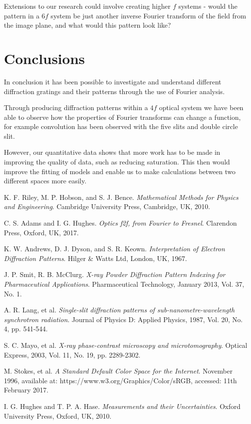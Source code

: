 \documentclass[twocolumn]{revtex4}
\begin{document}
Extensions to our research could involve creating higher $f$ systems - would the pattern in a $6f$ system be just another inverse Fourier transform of the field from the image plane, and what would this pattern look like?

\vspace{-5ex}
\section{Conclusions}
\vspace{-2ex}

In conclusion it has been possible to investigate and understand different diffraction gratings and their patterns through the use of Fourier analysis.

Through producing diffraction patterns within a $4f$ optical system we have been able to observe how the properties of Fourier transforms can change a function, for example convolution has been observed with the five slits and double circle slit.

However, our quantitative data shows that more work has to be made in improving the quality of data, such as reducing saturation. This then would improve the fitting of models and enable us to make calculations between two different spaces more easily.

\begin{thebibliography}{5}
	K. F. Riley, M. P. Hobson, and S. J. Bence.
	\textit{Mathematical Methods for Physics and Engineering}.
	Cambridge University Press, Cambridge, UK, 2010.
	
	C. S. Adams and I. G. Hughes.
	\textit{Optics f2f, from Fourier to Fresnel}.
	Clarendon Press, Oxford, UK, 2017.

	K. W. Andrews, D. J. Dyson, and S. R. Keown.
	\textit{Interpretation of Electron Diffraction Patterns}.
	Hilger \& Watts Ltd, London, UK, 1967.
	
	J. P. Smit, R. B. McClurg.	
	\textit{X-ray Powder Diffraction Pattern Indexing for Pharmaceutical Applications}.
	Pharmaceutical Technology, January 2013, Vol. 37, No. 1.
	
	A. R. Lang, et al.
	\textit{Single-slit diffraction patterns of sub-nanometre-wavelength synchrotron radiation}.
	Journal of Physics D: Applied Physics, 1987, Vol. 20, No. 4, pp. 541-544.
	
	S. C. Mayo, et al.
	\textit{X-ray phase-contrast microscopy and microtomography}.
	Optical Express, 2003, Vol. 11, No. 19, pp. 2289-2302.
	
	M. Stokes, et al.
	\textit{A Standard Default Color Space for the Internet}.
	November 1996, available at: https://www.w3.org/Graphics/Color/sRGB, accessed: 11th February 2017. 
	
	I. G. Hughes and T. P. A. Hase.
	\textit{Measurements and their Uncertainties}. 
	Oxford University Press, Oxford, UK, 2010.
	
\end{thebibliography}
\clearpage
\end{document}
